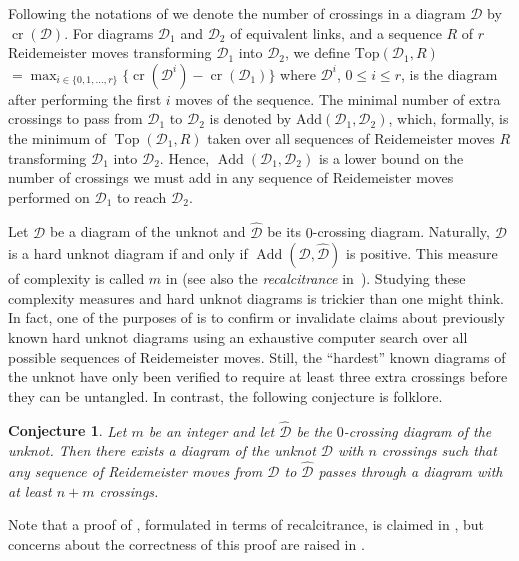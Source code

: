 \documentclass{article}
\newcommand{\cross}{\operatorname{cr}}
\newcommand{\addcross}{\operatorname{Top}}
\newcommand{\add}{\operatorname{Add}}
\newtheorem{conjecture}[theorem]{Conjecture}
\begin{document}
Following the notations of \cite{Mesmay_hard_unknot, Kauffman_untangling} we denote the number of crossings in a diagram $\mathcal{D}$ by $\cross(\mathcal{D})$. For diagrams $\mathcal{D}_1$ and $\mathcal{D}_2$ of equivalent links, and a sequence $R$ of $r$ Reidemeister moves transforming $\mathcal{D}_1$ into $\mathcal{D}_2$, we define \textbf{$\text{Top}(\mathcal{D}_1,R)$}$ = \max_{i\in \{0, 1, \ldots , r\}} \{\cross(\mathcal{D}^i) - \cross(\mathcal{D}_1)\}$ where $\mathcal{D}^i$, $0\leq i \leq r$, is the diagram after performing the first $i$ moves of the sequence. The minimal number of extra crossings to pass from $\mathcal{D}_1$ to $\mathcal{D}_2$ is denoted by \textbf{$\text{Add}(\mathcal{D}_1,\mathcal{D}_2)$}, which, formally, is the minimum of $\addcross(\mathcal{D}_1,R)$ taken over all sequences of Reidemeister moves $R$ transforming $\mathcal{D}_1$ into $\mathcal{D}_2$. Hence, $\add(\mathcal{D}_1,\mathcal{D}_2)$ is a lower bound on the number of crossings we must add in any sequence of Reidemeister moves performed on $\mathcal{D}_1$ to reach $\mathcal{D}_2$. 

Let $\mathcal{D}$ be a diagram of the unknot and $\hat{\mathcal{D}}$ be its $0$-crossing diagram. Naturally, $\mathcal{D}$ is a hard unknot diagram if and only if $\add(\mathcal{D},\hat{\mathcal{D}})$ is positive. This measure of complexity is called $m$ in \cite{Mesmay_hard_unknot} (see also the \emph{recalcitrance} in~\cite{Kauffman_untangling}). Studying these complexity measures and hard unknot diagrams is trickier than one might think. In fact, one of the purposes of \cite{Mesmay_hard_unknot} is to confirm or invalidate claims about previously known hard unknot diagrams using an exhaustive computer search over all possible sequences of Reidemeister moves. Still, the ``hardest'' known diagrams of the unknot have only been verified to require at least three extra crossings before they can be untangled. In contrast, the following conjecture is folklore.

\begin{conjecture}
  \label{conjm}
  Let $m$ be an integer and let $\hat{\mathcal{D}}$ be the $0$-crossing diagram of the unknot. Then there exists a diagram of the unknot $\mathcal{D}$ with $n$ crossings such that any sequence of Reidemeister moves from $\mathcal{D}$ to $\hat{\mathcal{D}}$ passes through a diagram with at least $n+m$ crossings.
\end{conjecture}

Note that a proof of , formulated in terms of recalcitrance, is claimed in \cite{Kauffman_untangling}, but concerns about the correctness of this proof are raised in \cite{Mesmay_hard_unknot}.
\end{document}
